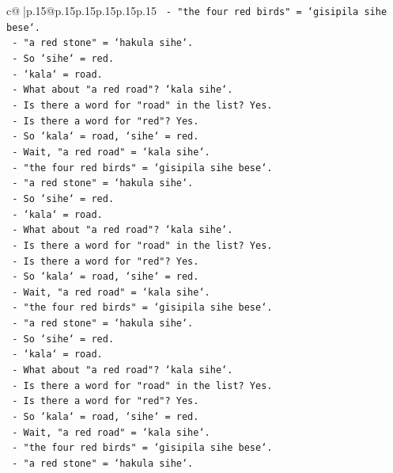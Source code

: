 \documentclass{article}
\begin{document}
{\begin{supertabular}{c@{$\;$}|p{.15\linewidth}@{}p{.15\linewidth}p{.15\linewidth}p{.15\linewidth}p{.15\linewidth}p{.15\linewidth}}
{{{\texttt{  {-} "the four red birds" = `gisipila sihe bese`.} \\
\texttt{  {-} "a red stone" = `hakula sihe`.} \\
\texttt{  {-} So `sihe` = red.} \\
\texttt{  {-} `kala` = road.} \\
\texttt{  {-} What about "a red road"? `kala sihe`.} \\
\texttt{  {-} Is there a word for "road" in the list? Yes.} \\
\texttt{  {-} Is there a word for "red"? Yes.} \\
\texttt{  {-} So `kala` = road, `sihe` = red.} \\
\texttt{  {-} Wait, "a red road" = `kala sihe`.} \\
\texttt{  {-} "the four red birds" = `gisipila sihe bese`.} \\
\texttt{  {-} "a red stone" = `hakula sihe`.} \\
\texttt{  {-} So `sihe` = red.} \\
\texttt{  {-} `kala` = road.} \\
\texttt{  {-} What about "a red road"? `kala sihe`.} \\
\texttt{  {-} Is there a word for "road" in the list? Yes.} \\
\texttt{  {-} Is there a word for "red"? Yes.} \\
\texttt{  {-} So `kala` = road, `sihe` = red.} \\
\texttt{  {-} Wait, "a red road" = `kala sihe`.} \\
\texttt{  {-} "the four red birds" = `gisipila sihe bese`.} \\
\texttt{  {-} "a red stone" = `hakula sihe`.} \\
\texttt{  {-} So `sihe` = red.} \\
\texttt{  {-} `kala` = road.} \\
\texttt{  {-} What about "a red road"? `kala sihe`.} \\
\texttt{  {-} Is there a word for "road" in the list? Yes.} \\
\texttt{  {-} Is there a word for "red"? Yes.} \\
\texttt{  {-} So `kala` = road, `sihe` = red.} \\
\texttt{  {-} Wait, "a red road" = `kala sihe`.} \\
\texttt{  {-} "the four red birds" = `gisipila sihe bese`.} \\
\texttt{  {-} "a red stone" = `hakula sihe`.} \\
}}}
\end{supertabular}}
\end{document}
